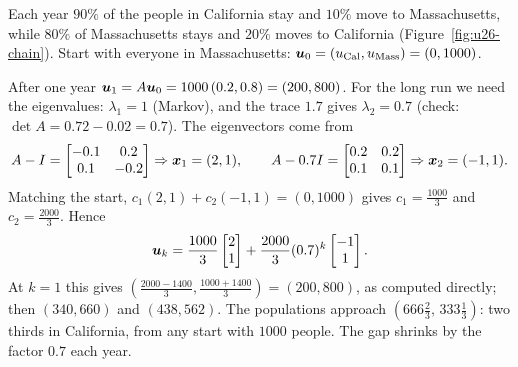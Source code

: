 \begin{example}\label{ex:u26-calmass}
Each year $90\%$ of the people in California stay and $10\%$ move to Massachusetts, while
$80\%$ of Massachusetts stays and $20\%$ moves to California (Figure~\ref{fig:u26-chain}).
Start with everyone in Massachusetts:
$\boldsymbol{u}_0=(u_{\text{Cal}},u_{\text{Mass}})=(0,1000)$.

After one year $\boldsymbol{u}_1=A\boldsymbol{u}_0=1000\,(0.2,0.8)=(200,800)$. For the long run we need the
eigenvalues: $\lambda_1=1$ (Markov), and the trace $1.7$ gives $\lambda_2=0.7$ (check:
$\det A=0.72-0.02=0.7$). The eigenvectors come from
\[
  A-I=\begin{bmatrix} -0.1&0.2\\ 0.1&-0.2\end{bmatrix}\Rightarrow\boldsymbol{x}_1=(2,1),\qquad
  A-0.7I=\begin{bmatrix} 0.2&0.2\\ 0.1&0.1\end{bmatrix}\Rightarrow\boldsymbol{x}_2=(-1,1).
\]
Matching the start, $c_1(2,1)+c_2(-1,1)=(0,1000)$ gives $c_1=\tfrac{1000}{3}$ and
$c_2=\tfrac{2000}{3}$. Hence
\[
  \boldsymbol{u}_k=\frac{1000}{3}\begin{bmatrix} 2\\ 1\end{bmatrix}
  +\frac{2000}{3}(0.7)^{k}\begin{bmatrix} -1\\ 1\end{bmatrix}.
\]
At $k=1$ this gives $(\tfrac{2000-1400}{3},\tfrac{1000+1400}{3})=(200,800)$, as computed
directly; then $(340,660)$ and $(438,562)$. The populations approach
$(666\tfrac23,\,333\tfrac13)$: two thirds in California, from any start with $1000$ people.
The gap shrinks by the factor $0.7$ each year.
\end{example}

